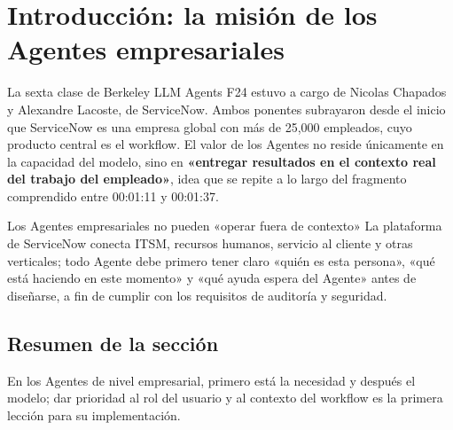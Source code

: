 \section{Introducción: la misión de los Agentes empresariales}
La sexta clase de Berkeley LLM Agents F24 estuvo a cargo de Nicolas Chapados y Alexandre Lacoste, de ServiceNow. Ambos ponentes subrayaron desde el inicio que ServiceNow es una empresa global con más de 25,000 empleados, cuyo producto central es el workflow. El valor de los Agentes no reside únicamente en la capacidad del modelo, sino en \textbf{«entregar resultados en el contexto real del trabajo del empleado»}, idea que se repite a lo largo del fragmento comprendido entre 00:01:11 y 00:01:37.

\begin{knowledgebox}{Los Agentes empresariales no pueden «operar fuera de contexto»}
La plataforma de ServiceNow conecta ITSM, recursos humanos, servicio al cliente y otras verticales; todo Agente debe primero tener claro «quién es esta persona», «qué está haciendo en este momento» y «qué ayuda espera del Agente» antes de diseñarse, a fin de cumplir con los requisitos de auditoría y seguridad.
\end{knowledgebox}

\subsection{Resumen de la sección}
En los Agentes de nivel empresarial, primero está la necesidad y después el modelo; dar prioridad al rol del usuario y al contexto del workflow es la primera lección para su implementación.

